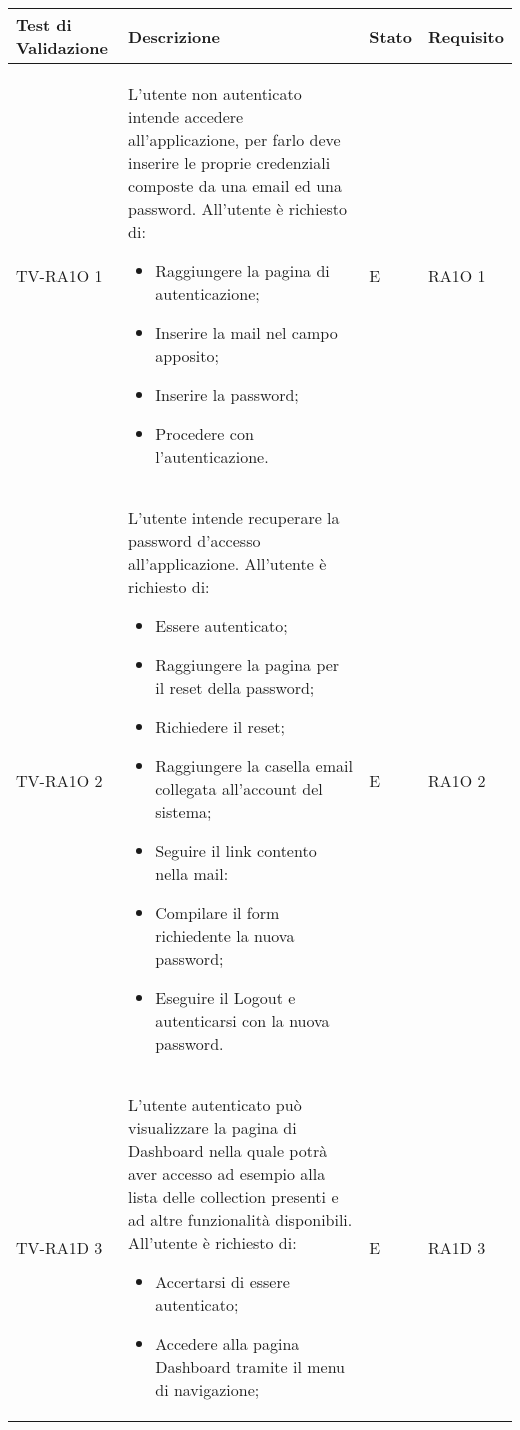 
	\begin{center}
	\def\arraystretch{1.5}
	\bgroup
		\begin{longtable}{| p{3cm} | p{6cm} | p{1.5cm} | p{2cm} | }
		\hline 
		 \textbf{Test di Validazione} & \textbf{Descrizione} & \textbf{Stato} & \textbf{Requisito} \\ \hline
				TV-RA1O 1 & 
				L'utente non autenticato intende accedere all'applicazione, per farlo deve inserire le proprie credenziali composte da una email ed una password.
All'utente è richiesto di:
\begin{itemize}
\item Raggiungere la pagina di autenticazione;
\item Inserire la mail nel campo apposito;
\item Inserire la password;
\item Procedere con l'autenticazione.
\end{itemize}
 & E & RA1O 1\newline  \\ \hline 
				TV-RA1O 2 & 
				L'utente intende recuperare la password d'accesso all'applicazione.
All'utente è richiesto di:
\begin{itemize}
\item Essere autenticato;
\item Raggiungere la pagina per il reset della password;
\item Richiedere il reset;
\item Raggiungere la casella email collegata all'account del sistema;
\item Seguire il link contento nella mail:
\item Compilare il form richiedente la nuova password;
\item Eseguire il Logout e autenticarsi con la nuova password.
\end{itemize} & E & RA1O 2\newline  \\ \hline 
				TV-RA1D 3 & 
				L'utente autenticato può visualizzare la pagina di Dashboard nella quale potrà aver accesso ad esempio alla lista delle collection presenti e ad altre funzionalità disponibili.
All'utente è richiesto di:
\begin{itemize}
\item Accertarsi di essere autenticato;
\item Accedere alla pagina Dashboard tramite il menu di navigazione;
\end{itemize} & E & RA1D 3\newline  \\ \hline 

\end{longtable}
\end{center}
